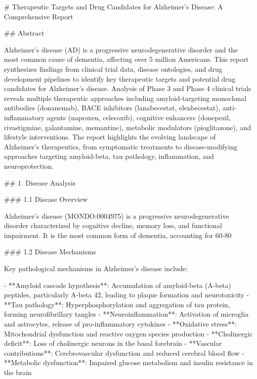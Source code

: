# Therapeutic Targets and Drug Candidates for Alzheimer's Disease: A Comprehensive Report

## Abstract

Alzheimer's disease (AD) is a progressive neurodegenerative disorder and the most common cause of dementia, affecting over 5 million Americans. This report synthesizes findings from clinical trial data, disease ontologies, and drug development pipelines to identify key therapeutic targets and potential drug candidates for Alzheimer's disease. Analysis of Phase 3 and Phase 4 clinical trials reveals multiple therapeutic approaches including amyloid-targeting monoclonal antibodies (donanemab), BACE inhibitors (lanabecestat, elenbecestat), anti-inflammatory agents (naproxen, celecoxib), cognitive enhancers (donepezil, rivastigmine, galantamine, memantine), metabolic modulators (pioglitazone), and lifestyle interventions. The report highlights the evolving landscape of Alzheimer's therapeutics, from symptomatic treatments to disease-modifying approaches targeting amyloid-beta, tau pathology, inflammation, and neuroprotection.

## 1. Disease Analysis

### 1.1 Disease Overview

Alzheimer's disease (MONDO:0004975) is a progressive neurodegenerative disorder characterized by cognitive decline, memory loss, and functional impairment. It is the most common form of dementia, accounting for 60-80%

### 1.2 Disease Mechanisms

Key pathological mechanisms in Alzheimer's disease include:

- **Amyloid cascade hypothesis**: Accumulation of amyloid-beta (A-beta) peptides, particularly A-beta 42, leading to plaque formation and neurotoxicity
- **Tau pathology**: Hyperphosphorylation and aggregation of tau protein, forming neurofibrillary tangles
- **Neuroinflammation**: Activation of microglia and astrocytes, release of pro-inflammatory cytokines
- **Oxidative stress**: Mitochondrial dysfunction and reactive oxygen species production
- **Cholinergic deficit**: Loss of cholinergic neurons in the basal forebrain
- **Vascular contributions**: Cerebrovascular dysfunction and reduced cerebral blood flow
- **Metabolic dysfunction**: Impaired glucose metabolism and insulin resistance in the brain

